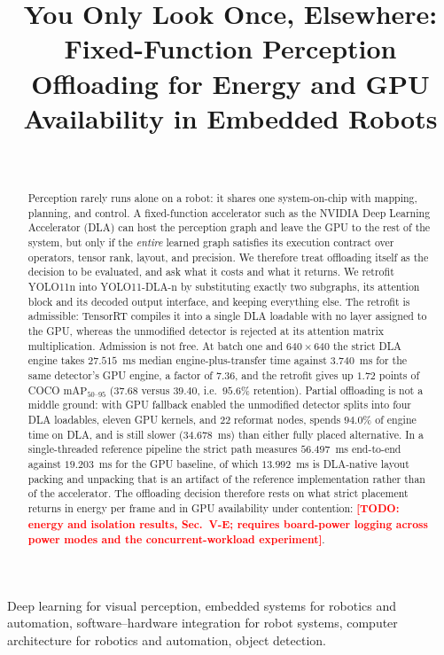 \documentclass[conference]{IEEEtran}
\title{You Only Look Once, Elsewhere: Fixed-Function Perception Offloading
for Energy and GPU Availability in Embedded Robots}
\author{\IEEEauthorblockN{Anonymous Submission}\\
\IEEEauthorblockA{Paper under double-anonymous review}}
\newcommand{\TODO}[1]{\textcolor{red}{\textbf{[TODO: #1]}}}
\begin{document}
\maketitle

\begin{abstract}
Perception rarely runs alone on a robot: it shares one system-on-chip with
mapping, planning, and control. A fixed-function accelerator such as the NVIDIA
Deep Learning Accelerator (DLA) can host the perception graph and leave the GPU
to the rest of the system, but only if the \emph{entire} learned graph satisfies
its execution contract over operators, tensor rank, layout, and precision. We
therefore treat offloading itself as the decision to be evaluated, and ask what
it costs and what it returns. We retrofit YOLO11n into YOLO11-DLA-n by
substituting exactly two subgraphs, its attention block and its decoded output
interface, and keeping everything else. The retrofit is admissible: TensorRT
compiles it into a single DLA loadable with no layer assigned to the GPU,
whereas the unmodified detector is rejected at its attention matrix
multiplication. Admission is not free. At batch one and $640\times640$ the
strict DLA engine takes $27.515$~ms median engine-plus-transfer time against
$3.740$~ms for the same detector's GPU engine, a factor of $7.36$, and the
retrofit gives up $1.72$ points of COCO $\mathrm{mAP}_{50\text{--}95}$
($37.68$ versus $39.40$, i.e.\ $95.6\%$ retention). Partial offloading is not a
middle ground: with GPU fallback enabled the unmodified detector splits into
four DLA loadables, eleven GPU kernels, and 22 reformat nodes, spends $94.0\%$
of engine time on DLA, and is still slower ($34.678$~ms) than either fully
placed alternative. In a single-threaded reference pipeline the strict path
measures $56.497$~ms end-to-end against $19.203$~ms for the GPU baseline, of
which $13.992$~ms is DLA-native layout packing and unpacking that is an
artifact of the reference implementation rather than of the accelerator. The
offloading decision therefore rests on what strict placement returns in energy
per frame and in GPU availability under contention: \TODO{energy and isolation
results, Sec.~V-E; requires board-power logging across power modes and the
concurrent-workload experiment}.
\end{abstract}

\begin{IEEEkeywords}
Deep learning for visual perception, embedded systems for robotics and
automation, software--hardware integration for robot systems, computer
architecture for robotics and automation, object detection.
\end{IEEEkeywords}











\end{document}

